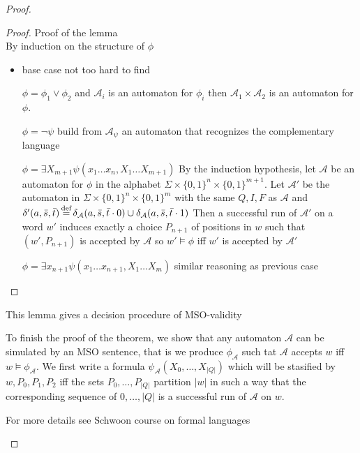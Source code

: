 \begin{proof}
	\begin{proof} Proof of the lemma\\
		By induction on the structure of $\phi$
		\begin{itemize}
			\item base case not too hard to find
			\item[$\phi = \phi_{1} \lor \phi_{2}$] and $\mathcal{A}_{i}$ 
				is an automaton for $\phi_{i}$ then $\mathcal{A}_{1}
				\times \mathcal{A}_{2}$ is an automaton for $\phi$.
			\item[$\phi = \neg \psi$ ] build from $\mathcal{A}_{\psi}$ an
				automaton that recognizes the complementary language
			\item[$\phi = \exists X_{m+1}\psi(x_{1}\ldots x_{n}, 
				X_{1}\ldots X_{m+1})$] By the induction hypothesis, 
				let $\mathcal{A}$ be an automaton
				for $\phi$ in the alphabet $\Sigma \times \{0,1\}^{n}
				\times \{0, 1\}^{m+1}$.
				Let $\mathcal{A}'$ be the automaton in $\Sigma\times\{0,1\}^{n}
				\times\{0,1\}^{m}$ with the same $Q, I, F$ 
				as $\mathcal{A}$ and $\delta'(a, \bar{s},\bar{t}) \operatorname{\stackrel{\text{def}}{=}}
				\delta_{\mathcal{A}}(a,\bar{s},\bar{t}\cdot 0) \cup
				\delta_{\mathcal{A}}(a,\bar{s},\bar{t}\cdot 1)$
				Then a successful run of $\mathcal{A}'$ on a word $w'$ 
				induces exactly a choice  $P_{n+1}$ of positions in $w$ 
				such that $(w', P_{n+1})$ is accepted by $\mathcal{A}$ 
				so $w'\models \phi$ iff $w'$ is accepted by $\mathcal{A}'$ 
			\item[$\phi = \exists x_{n+1}\psi(x_{1}\ldots x_{n+1},
				X_{1}\ldots X_{m})$] similar reasoning as previous case
		\end{itemize}
	\end{proof}
	\begin{remark}
		This lemma gives a decision procedure of MSO-validity
	\end{remark}
	To finish the proof of the theorem, we show that any automaton $\mathcal{A}$ 
	can be simulated by an MSO sentence, that is we produce $\phi_{\mathcal{A}}$ 
	such tat $\mathcal{A} $ accepts $w$ iff $w \models \phi_{\mathcal{A}}$.
	We first write a formula $\psi_{\mathcal{A}}(X_{0}, \ldots, X_{|Q|})$ 
	which will be stasified by $w, P_{0}, P_{1}, P_{2}$ iff the sets
	$P_{0}, \ldots, P_{|Q|}$ partition $|w|$ in such a way that the
	corresponding sequence of $0, \ldots, |Q|$ 
	is a successful run of $\mathcal{A}$ on $w$.
	
	\begin{remark}
		For more details see Schwoon course on formal languages
	\end{remark}
\end{proof}

